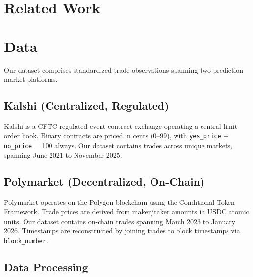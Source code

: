 \documentclass[11pt]{article}
\begin{document}
\section{Related Work}
\label{sec:related}


\section{Data}
\label{sec:data}

Our dataset comprises \NStandardizedTrades{} standardized trade observations spanning two prediction market platforms.

\subsection{Kalshi (Centralized, Regulated)}

Kalshi is a CFTC-regulated event contract exchange operating a central limit order book. Binary contracts are priced in cents (0--99), with \texttt{yes\_price} + \texttt{no\_price} = 100 always. Our dataset contains \NKalshiTrades{} trades across \NKalshiMarkets{} unique markets, spanning June 2021 to November 2025.

\subsection{Polymarket (Decentralized, On-Chain)}

Polymarket operates on the Polygon blockchain using the Conditional Token Framework. Trade prices are derived from maker/taker amounts in USDC atomic units. Our dataset contains \NPolymarketTrades{} on-chain trades spanning March 2023 to January 2026. Timestamps are reconstructed by joining trades to block timestamps via \texttt{block\_number}.

\subsection{Data Processing}
\end{document}
